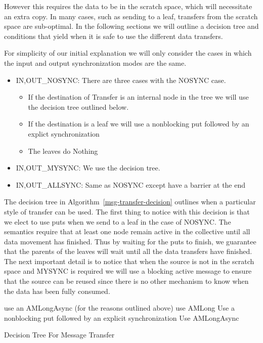 \documentclass[times,10pt]{article}
\begin{document}
However this requires the data to be in the scratch space, which will necessitate an extra copy. In many cases, such as sending to a leaf, transfers from the scratch space are sub-optimal. In the following sections we will outline a decision tree and conditions that yield when it is safe to use the different data transfers.

For simplicity of our initial explanation we will only consider the cases in which the input and output synchronization modes are the same. 

\begin{itemize}
\item IN,OUT\_NOSYNC: There are three cases with the NOSYNC case.
\begin{itemize}
\item If the destination of Transfer is an internal node in the tree we will use the decision tree outlined below. 
\item If the destination is a leaf we will use a nonblocking put followed by an explict synchronization
\item The leaves do Nothing
\end{itemize}
\item IN,OUT\_MYSYNC: We use the decision tree.
\item IN,OUT\_ALLSYNC: Same as NOSYNC except have a barrier at the end
\end{itemize}


The decision tree in Algorithm~\ref{msg-transfer-decision} outlines when a particular style of transfer can be used. The first thing to notice with this decision is that we elect to use puts when we send to a leaf in the case of NOSYNC. The semantics require that at least one node remain active in the collective until all data movement has finished. Thus by waiting for the puts to finish, we guarantee that the parents of the leaves will wait until all the data transfers have finished.  The next important detail is to notice that when the source is not in the scratch space and MYSYNC is required we will use a blocking active message to ensure that the source can be reused since there is no other mechanism to know when the data has been fully consumed. 


\begin{algorithm}[h]
\begin{algorithmic}[1]
\STATE use an AMLongAsync (for the reasons outlined above)
\ELSE
{}
\STATE use AMLong
\ELSE
{}
\STATE Use a nonblocking put followed by an explicit synchronization
\ELSE
\STATE Use AMLongAsync
\ENDIF
\ENDIF
\ENDIF
\end{algorithmic}
\caption{Decision Tree For Message Transfer}
\label{msg-transfer-decision}
\end{algorithm}
\end{document}
